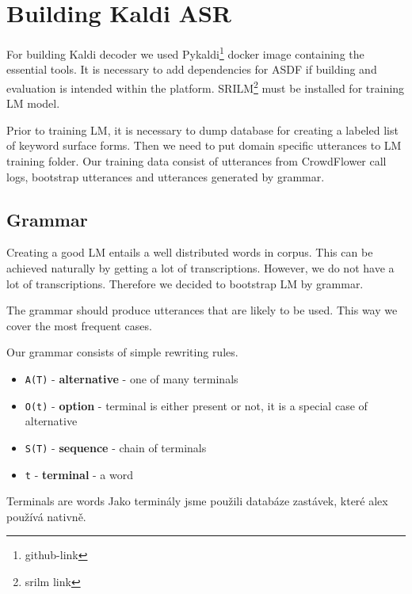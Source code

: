 \section{Building Kaldi ASR}

For building Kaldi decoder we used Pykaldi\footnote{github-link} docker image containing the essential tools.
It is necessary to add dependencies for ASDF if building and evaluation is intended within the platform.
SRILM\footnote{srilm link} must be installed for training LM model.


Prior to training LM, it is necessary to dump database for creating a labeled list of keyword surface forms.
Then we need to put domain specific utterances to LM training folder.
Our training data consist of utterances from CrowdFlower call logs, bootstrap utterances and utterances generated by grammar.

\subsection{Grammar}

Creating a good LM entails a well distributed words in corpus.
This can be achieved naturally by getting a lot of transcriptions.
However, we do not have a lot of transcriptions.
Therefore we decided to bootstrap LM by grammar.

The grammar should produce utterances that are likely to be used.
This way we cover the most frequent cases.

Our grammar consists of simple rewriting rules.
\begin{itemize}
	\item \texttt{A(T)} - \textbf{alternative} - one of many terminals %
	\item \texttt{O(t)} - \textbf{option} - terminal is either present or not, it is a special case of alternative
	\item \texttt{S(T)} - \textbf{sequence} - chain of terminals %
	\item \texttt{t} - \textbf{terminal} - a word
\end{itemize}

Terminals are words
Jako terminály jsme použili databáze zastávek, které alex používá nativně.

